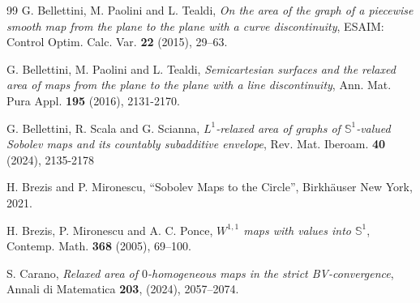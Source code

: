 \documentclass[a4paper,11pt]{article}
\numberwithin{equation}{section}
\newcommand\Suno{{\mathbb S}^1}
\begin{document}
\begin{thebibliography}{99}
G. Bellettini, M. Paolini and L. Tealdi,
\emph{On the area of the graph of a piecewise smooth map from the
	plane to the plane with a curve discontinuity},
ESAIM: Control Optim. Calc. Var.
{\bf 22} (2015), 29--63.

G. Bellettini, M. Paolini and L. Tealdi,
\emph{Semicartesian surfaces and  the relaxed area of
	maps from the plane to the plane with a line discontinuity},
Ann. Mat. Pura Appl.
{\bf 195} (2016), 2131-2170.

G. Bellettini, R. Scala and  G. Scianna, \emph{$L^1$-relaxed area of graphs of $\mathbb S^1$-valued
	Sobolev maps 
	and its countably subadditive envelope},
Rev. Mat. Iberoam. {\bf 40} (2024), 2135-2178
%
%
%
%
%
%
%
%
%
%

H. Brezis and P. Mironescu, 
``Sobolev Maps to the Circle'', Birkh\"auser New York, 2021.
 
H. Brezis, P. Mironescu and  A. C. Ponce, 
\emph{$W^{1,1}$ maps with values into $\Suno$}, 
Contemp. Math. {\bf 368} (2005), 69--100.


 S. Carano, \emph{Relaxed area of $0$-homogeneous maps in the strict BV-convergence}, Annali di Matematica \textbf{203}, (2024), 2057--2074.


\end{thebibliography}
\end{document}
